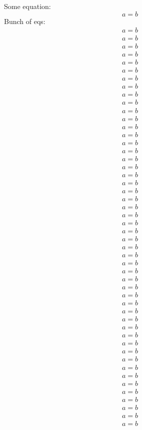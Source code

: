 \documentclass[fontsize=8pt]{scrartcl}
\begin{document}
\begin{multicols}{4}
Some equation:
\begin{equation*}
a=b
\end{equation*}
Bunch of eqs:
\begin{gather*}
a=b \\
a=b \\
a=b \\
a=b \\
a=b \\
a=b \\
a=b \\
a=b \\
a=b \\
a=b \\
a=b \\
a=b \\
a=b \\
a=b \\
a=b \\
a=b \\
a=b \\
a=b \\
a=b \\
a=b \\
a=b \\
a=b \\
a=b \\
a=b \\
a=b \\
a=b \\
a=b \\
a=b \\
a=b \\
a=b \\
a=b \\
a=b \\
a=b \\
a=b \\
a=b \\
a=b \\
a=b \\
a=b \\
a=b \\
a=b \\
a=b \\
a=b \\
a=b \\
a=b \\
a=b \\
a=b \\
a=b \\
a=b \\
a=b \\
a=b \\

\end{gather*}
\end{multicols}
\end{document}
